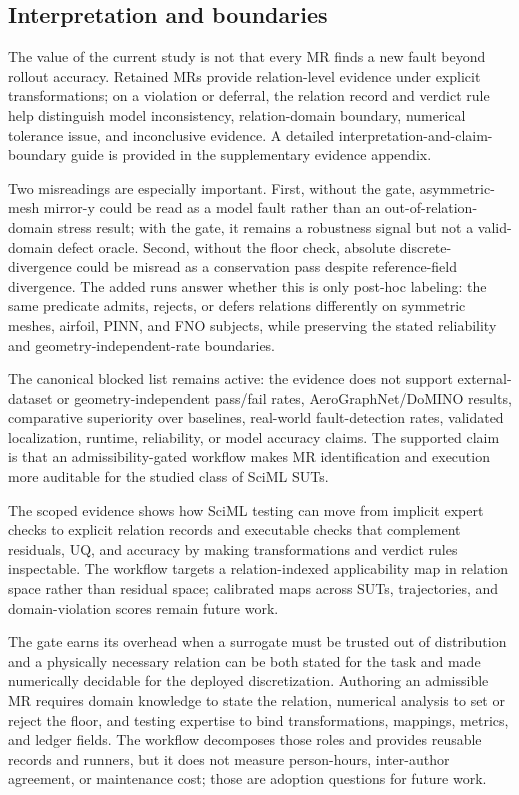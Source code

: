 \documentclass[preprint,12pt,authoryear]{elsarticle}
\begin{document}
\subsection{Interpretation and boundaries}
\label{sec:discussion}
\label{subsec:still-blocked}
\label{subsec:scoped-interpretation}

The value of the current study is not that every MR finds a new fault beyond rollout accuracy. Retained MRs provide relation-level evidence under explicit transformations; on a violation or deferral, the relation record and verdict rule help distinguish model inconsistency, relation-domain boundary, numerical tolerance issue, and inconclusive evidence. A detailed interpretation-and-claim-boundary guide is provided in the supplementary evidence appendix.

Two misreadings are especially important. First, without the gate, asymmetric-mesh mirror-y could be read as a model fault rather than an out-of-relation-domain stress result; with the gate, it remains a robustness signal but not a valid-domain defect oracle. Second, without the floor check, absolute discrete-divergence could be misread as a conservation pass despite reference-field divergence. The added runs answer whether this is only post-hoc labeling: the same predicate admits, rejects, or defers relations differently on symmetric meshes, airfoil, PINN, and FNO subjects, while preserving the stated reliability and geometry-independent-rate boundaries.

The canonical blocked list remains active: the evidence does not support external-dataset or geometry-independent pass/fail rates, AeroGraphNet/DoMINO results, comparative superiority over baselines, real-world fault-detection rates, validated localization, runtime, reliability, or model accuracy claims. The supported claim is that an admissibility-gated workflow makes MR identification and execution more auditable for the studied class of SciML SUTs.

The scoped evidence shows how SciML testing can move from implicit expert checks to explicit relation records and executable checks that complement residuals, UQ, and accuracy by making transformations and verdict rules inspectable. The workflow targets a relation-indexed applicability map in relation space rather than residual space; calibrated maps across SUTs, trajectories, and domain-violation scores remain future work.

The gate earns its overhead when a surrogate must be trusted out of distribution and a physically necessary relation can be both stated for the task and made numerically decidable for the deployed discretization. Authoring an admissible MR requires domain knowledge to state the relation, numerical analysis to set or reject the floor, and testing expertise to bind transformations, mappings, metrics, and ledger fields. The workflow decomposes those roles and provides reusable records and runners, but it does not measure person-hours, inter-author agreement, or maintenance cost; those are adoption questions for future work.
\end{document}
